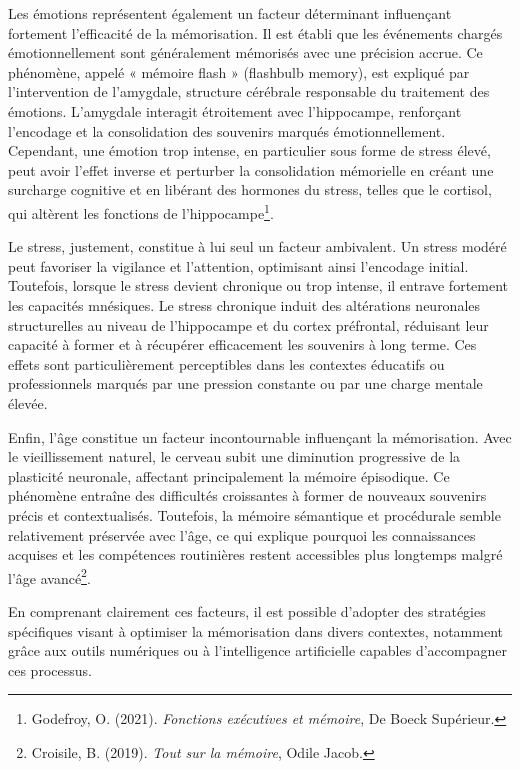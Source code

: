 \documentclass[11pt,a4paper]{report}
\begin{document}
Les émotions représentent également un facteur déterminant influençant fortement l’efficacité de la mémorisation. Il est établi que les événements chargés émotionnellement sont généralement mémorisés avec une précision accrue. Ce phénomène, appelé « mémoire flash » (flashbulb memory), est expliqué par l’intervention de l’amygdale, structure cérébrale responsable du traitement des émotions. L’amygdale interagit étroitement avec l’hippocampe, renforçant l’encodage et la consolidation des souvenirs marqués émotionnellement. Cependant, une émotion trop intense, en particulier sous forme de stress élevé, peut avoir l’effet inverse et perturber la consolidation mémorielle en créant une surcharge cognitive et en libérant des hormones du stress, telles que le cortisol, qui altèrent les fonctions de l’hippocampe\footnote{Godefroy, O. (2021). \textit{Fonctions exécutives et mémoire}, De Boeck Supérieur.}.

Le stress, justement, constitue à lui seul un facteur ambivalent. Un stress modéré peut favoriser la vigilance et l’attention, optimisant ainsi l’encodage initial. Toutefois, lorsque le stress devient chronique ou trop intense, il entrave fortement les capacités mnésiques. Le stress chronique induit des altérations neuronales structurelles au niveau de l’hippocampe et du cortex préfrontal, réduisant leur capacité à former et à récupérer efficacement les souvenirs à long terme. Ces effets sont particulièrement perceptibles dans les contextes éducatifs ou professionnels marqués par une pression constante ou par une charge mentale élevée.

Enfin, l’âge constitue un facteur incontournable influençant la mémorisation. Avec le vieillissement naturel, le cerveau subit une diminution progressive de la plasticité neuronale, affectant principalement la mémoire épisodique. Ce phénomène entraîne des difficultés croissantes à former de nouveaux souvenirs précis et contextualisés. Toutefois, la mémoire sémantique et procédurale semble relativement préservée avec l’âge, ce qui explique pourquoi les connaissances acquises et les compétences routinières restent accessibles plus longtemps malgré l’âge avancé\footnote{Croisile, B. (2019). \textit{Tout sur la mémoire}, Odile Jacob.}.

En comprenant clairement ces facteurs, il est possible d’adopter des stratégies spécifiques visant à optimiser la mémorisation dans divers contextes, notamment grâce aux outils numériques ou à l’intelligence artificielle capables d’accompagner ces processus.
\end{document}
